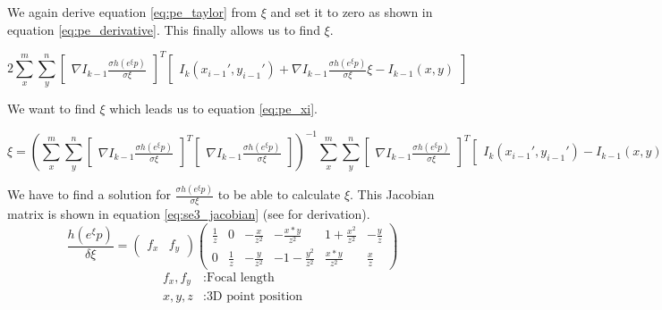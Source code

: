 \documentclass[11pt,a4paper,titlepage,oneside]{report}
\begin{document}
We again derive equation \ref{eq:pe_taylor} from $\xi$ and set it to zero as shown in equation \ref{eq:pe_derivative}. This finally allows us to find $\xi$.

\begin{equation}\label{eq:pe_derivative}
  2\sum_x^m\sum_y^n\begin{bmatrix}\nabla I_{k-1}\frac{\sigma h(e^{\xi}p)}{\sigma \xi}\end{bmatrix}^T\begin{bmatrix}I_{k}(x_{i-1}',y_{i-1}')+\nabla I_{k-1}\frac{\sigma h(e^{\xi} p)}{\sigma \xi}\xi-I_{k-1}(x,y)\end{bmatrix}
\end{equation}

We want to find $\xi$ which leads us to equation \ref{eq:pe_xi}.

\tiny
\begin{equation}\label{eq:pe_xi}
  \xi=(\sum_x^m\sum_y^n\begin{bmatrix}\nabla I_{k-1}\frac{\sigma h(e^{\xi}p)}{\sigma \xi}\end{bmatrix}^T\begin{bmatrix}\nabla I_{k-1}\frac{\sigma h(e^{\xi}p)}{\sigma \xi}\end{bmatrix})^{-1}
  \sum_x^m\sum_y^n\begin{bmatrix}\nabla I_{k-1}\frac{\sigma h(e^{\xi}p)}{\sigma \xi}\end{bmatrix}^T\begin{bmatrix}I_{k}(x_{i-1}',y_{i-1}') - I_{k-1}(x,y)\end{bmatrix}
\end{equation}
\normalsize

We have to find a solution for $\frac{\sigma h(e^{\xi}p)}{\sigma \xi}$ to be able to calculate $\xi$. This Jacobian matrix is shown in equation \ref{eq:se3_jacobian} (see \cite{se3_explain} for derivation).
\begin{equation}\label{eq:se3_jacobian}
  \frac{h(e^{\xi}p)}{\delta \xi}=
  \begin{pmatrix}
    f_x & f_y
  \end{pmatrix}
  \begin{pmatrix}
    \frac{1}{z} & 0 & -\frac{x}{z^2} & -\frac{x*y}{z^2} & 1 + \frac{x^2}{z^2} & -\frac{y}{z} \\
    0 & \frac{1}{z}  & -\frac{y}{z^2} & -1 - \frac{y^2}{z^2} & \frac{x*y}{z^2} &  \frac{x}{z}
  \end{pmatrix}
\end{equation}
\begin{align*}
  f_x,f_y  &:  \text{Focal length}\\
  x,y,z    &:  \text{3D point position}\\
\end{align*}
\end{document}
